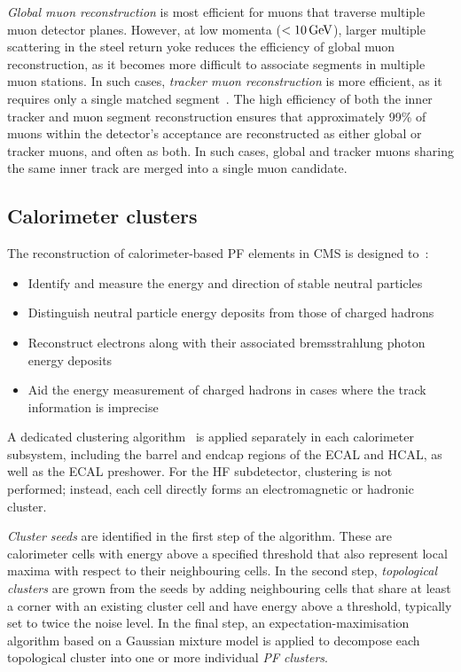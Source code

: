\textit{Global muon reconstruction} is most efficient for muons that traverse multiple muon detector planes. However, at low momenta ($<10\,\text{Ge\hspace{-.08em}V}$), larger multiple scattering in the steel return yoke reduces the efficiency of global muon reconstruction, as it becomes more difficult to associate segments in multiple muon stations. In such cases, \textit{tracker muon reconstruction} is more efficient, as it requires only a single matched segment~\cite{CMS_Muon_System_Performance_2}. The high efficiency of both the inner tracker and muon segment reconstruction ensures that approximately 99\% of muons within the detector's acceptance are reconstructed as either global or tracker muons, and often as both.  In such cases, global and tracker muons sharing the same inner track are merged into a single muon candidate.

\subsection{Calorimeter clusters}

The reconstruction of calorimeter-based \ac{PF} elements in \ac{CMS} is designed to~\cite{ParticleFlow}:

\begin{itemize}
    \item Identify and measure the energy and direction of stable neutral particles
    \item Distinguish neutral particle energy deposits from those of charged hadrons
    \item Reconstruct electrons along with their associated bremsstrahlung photon energy deposits
    \item Aid the energy measurement of charged hadrons in cases where the track information is imprecise
\end{itemize}

A dedicated clustering algorithm~\cite{ParticleFlow} is applied separately in each calorimeter subsystem, including the barrel and endcap regions of the \ac{ECAL} and \ac{HCAL}, as well as the \ac{ECAL} preshower. For the \ac{HF} subdetector, clustering is not performed; instead, each cell directly forms an electromagnetic or hadronic cluster. 

\textit{Cluster seeds} are identified in the first step of the algorithm. These are calorimeter cells with energy above a specified threshold that also represent local maxima with respect to their neighbouring cells. In the second step, \textit{topological clusters} are grown from the seeds by adding neighbouring cells that share at least a corner with an existing cluster cell and have energy above a threshold, typically set to twice the noise level. In the final step, an expectation-maximisation algorithm based on a Gaussian mixture model is applied to decompose each topological cluster into one or more individual \textit{\ac{PF} clusters}.

